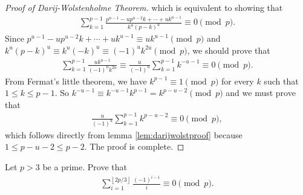 \documentclass{subfile}
\begin{document}
\begin{proof}[Proof of Darij-Wolstenholme Theorem]
		which is equivalent to showing that
		\begin{align*}
		\sum_{k = 1}^{p - 1}\frac {p^{u - 1} - up^{u - 2}k+\cdots + uk^{u - 1}}{k^{u}\left(p - k\right)^{u}} \equiv 0 \pmod p.
		\end{align*}
		Since $p^{u - 1} - up^{u - 2}k+\cdots + uk^{u - 1} \equiv uk^{u - 1} \pmod p$ and $k^{u}\left(p - k\right)^{u} \equiv k^{u}\left( - k\right)^{u} \equiv (-1)^u k^{2u} \pmod p$, we should prove that
		\begin{align*}
		\sum_{k = 1}^{p - 1}\frac {uk^{u - 1}}{\left( - 1\right)^{u}k^{2u}}\equiv\frac {u}{\left( - 1\right)^{u}}\sum_{k = 1}^{p - 1}k^{ - u - 1} \equiv 0 \pmod p.
		\end{align*}
		From Fermat's little theorem, we have $k^{p-1} \equiv 1 \pmod p$ for every $k$ such that $1 \leq k \leq p-1$. So $ k^{ - u - 1}\equiv k^{ - u - 1}k^{p - 1} = k^{p - u - 2}\pmod p$ and we must prove that
		\begin{align*}
		\frac {u}{\left( - 1\right)^{u}}\sum_{k = 1}^{p - 1}k^{p - u - 2}\equiv 0 \pmod p,
		\end{align*}
		which follows directly from lemma \eqref{lem:darijwolstproof} because $ 1\leq p - u - 2\leq p - 2$. The proof is complete.
	\end{proof}

	\begin{problem}
		Let $p>3$ be a prime. Prove that
		\begin{align*}
		\sum_{i = 1}^{\left\lfloor 2p/3\right\rfloor}\frac {\left( - 1\right)^{i - 1}}{i} \equiv 0 \pmod p.
		\end{align*}
	\end{problem}
\end{document}
